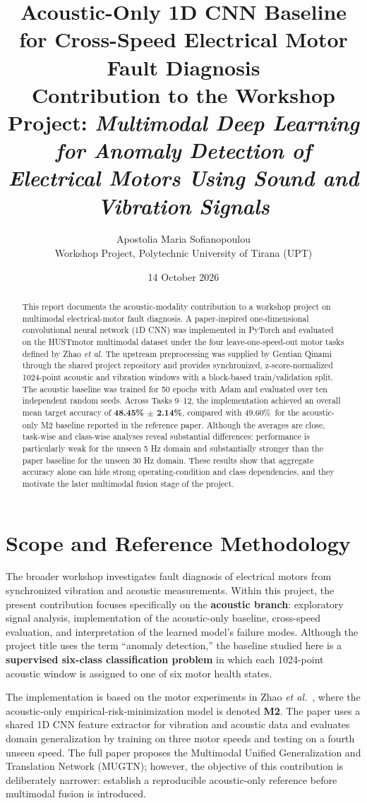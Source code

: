 \documentclass[10pt,a4paper,twocolumn]{article}
\title{\textbf{Acoustic-Only 1D CNN Baseline for Cross-Speed Electrical Motor Fault Diagnosis}\\
\large Contribution to the Workshop Project: \emph{Multimodal Deep Learning for Anomaly Detection of Electrical Motors Using Sound and Vibration Signals}}
\author{Apostolia Maria Sofianopoulou\\
\small Workshop Project, Polytechnic University of Tirana (UPT)}
\date{14 October 2026}
\newcommand{\ours}{\textbf{48.45\% $\pm$ 2.14\%}}
\newcommand{\paperavg}{49.60\%}
\begin{document}
\maketitle

\begin{abstract}
This report documents the acoustic-modality contribution to a workshop project on multimodal electrical-motor fault diagnosis. A paper-inspired one-dimensional convolutional neural network (1D CNN) was implemented in PyTorch and evaluated on the HUSTmotor multimodal dataset under the four leave-one-speed-out motor tasks defined by Zhao \emph{et al.} The upstream preprocessing was supplied by Gentian Qinami through the shared project repository and provides synchronized, z-score-normalized 1024-point acoustic and vibration windows with a block-based train/validation split. The acoustic baseline was trained for 50 epochs with Adam and evaluated over ten independent random seeds. Across Tasks 9--12, the implementation achieved an overall mean target accuracy of \ours, compared with \paperavg\ for the acoustic-only M2 baseline reported in the reference paper. Although the averages are close, task-wise and class-wise analyses reveal substantial differences: performance is particularly weak for the unseen 5 Hz domain and substantially stronger than the paper baseline for the unseen 30 Hz domain. These results show that aggregate accuracy alone can hide strong operating-condition and class dependencies, and they motivate the later multimodal fusion stage of the project.
\end{abstract}

\section{Scope and Reference Methodology}

The broader workshop investigates fault diagnosis of electrical motors from synchronized vibration and acoustic measurements. Within this project, the present contribution focuses specifically on the \textbf{acoustic branch}: exploratory signal analysis, implementation of the acoustic-only baseline, cross-speed evaluation, and interpretation of the learned model's failure modes. Although the project title uses the term ``anomaly detection,'' the baseline studied here is a \textbf{supervised six-class classification problem} in which each 1024-point acoustic window is assigned to one of six motor health states.

The implementation is based on the motor experiments in Zhao \emph{et al.}~\cite{zhao2025}, where the acoustic-only empirical-risk-minimization model is denoted \textbf{M2}. The paper uses a shared 1D CNN feature extractor for vibration and acoustic data and evaluates domain generalization by training on three motor speeds and testing on a fourth unseen speed. The full paper proposes the Multimodal Unified Generalization and Translation Network (MUGTN); however, the objective of this contribution is deliberately narrower: establish a reproducible acoustic-only reference before multimodal fusion is introduced.
\end{document}
